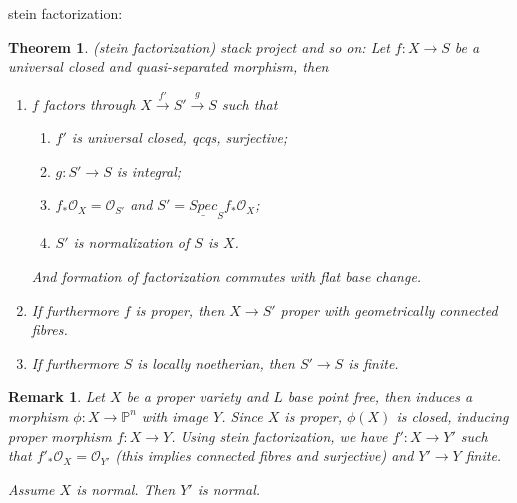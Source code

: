 \documentclass{article}
\newtheorem{thm}[defn]{Theorem}
\newtheorem{rmk}[defn]{Remark}
\begin{document}
stein factorization:
\begin{thm}
	(stein factorization) stack project and so on: Let $ f:X\to S $ be a universal closed and quasi-separated morphism, then
	\begin{enumerate}
		\item $ f $ factors through $ X\xrightarrow{f'} S'\xrightarrow{g} S$ such that
		\begin{enumerate}
			\item $ f' $ is universal closed, qcqs, surjective;
			\item $ g:S'\to S $ is integral;
			\item $ f_*\mathcal{O}_X=\mathcal{O}_{S'} $ and $ S'=\underline{Spec}_Sf_*\mathcal{O}_X $;
			\item $ S' $ is normalization of $ S $ is $ X $.
		\end{enumerate}
		And formation of factorization commutes with flat base change.
		\item If furthermore $ f $ is proper, then $ X\to S' $ proper with geometrically connected fibres.
		\item If furthermore $ S $ is locally noetherian,  then $ S'\to S $ is finite.
	\end{enumerate}
\end{thm}
\begin{rmk}
	Let $ X $ be a proper variety and $ L $ base point free, then induces a morphism $ \phi:X\to \mathbb{P}^n $ with image $ Y $. Since $ X $ is proper, $ \phi(X) $ is closed, inducing proper morphism $ f:X\to Y $. Using stein factorization, we have $ f':X\to Y' $ such that $ f'_*\mathcal{O}_X=\mathcal{O}_{Y'} $ (this implies connected fibres and surjective) and $ Y'\to Y $ finite.
	
	Assume $ X $ is normal. Then $ Y' $ is normal.	 
\end{rmk}
\end{document}

